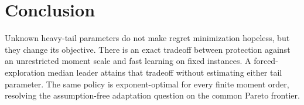 \documentclass[twoside]{article}
\begin{document}
\section{Conclusion}

Unknown heavy-tail parameters do not make regret minimization hopeless, but
they change its objective. There is an exact tradeoff between protection
against an unrestricted moment scale and fast learning on fixed instances.
A forced-exploration median leader attains that tradeoff without estimating
either tail parameter. The same policy is exponent-optimal for every finite
moment order, resolving the assumption-free adaptation question on the
common Pareto frontier.


\end{document}
